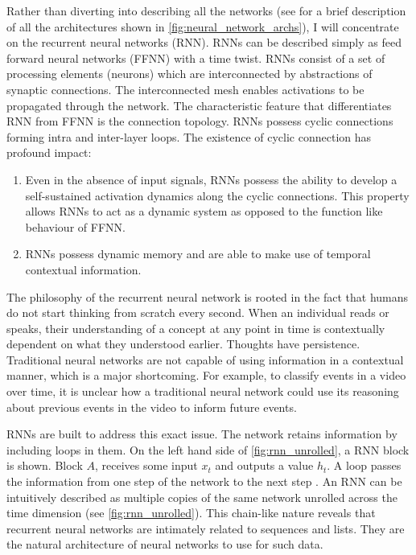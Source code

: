 Rather than diverting into describing all the networks (see \citep{neuralnetworkzoo} for a brief description of all the architectures shown in \figurename \ref{fig:neural_network_archs}), I will concentrate on the recurrent neural networks (RNN). RNNs can be described simply as feed forward neural networks (FFNN) with a time twist. RNNs consist of a set of processing elements (neurons) which are interconnected by abstractions of synaptic connections. The interconnected mesh enables activations to be propagated through the network. The characteristic feature that differentiates RNN from FFNN is the connection topology. RNNs possess cyclic connections forming intra and inter-layer loops. The existence of cyclic connection has profound impact: 
\begin{enumerate}
	\item Even in the absence of input signals, RNNs possess the ability to develop a self-sustained activation dynamics along the cyclic connections. This property allows RNNs to act as a dynamic system as opposed to the function like behaviour of FFNN.
	\item RNNs possess dynamic memory and are able to make use of temporal contextual information. 
\end{enumerate}

The philosophy of the recurrent neural network is rooted in the fact that humans do not start thinking from scratch every second. When an individual reads or speaks, their understanding of a concept at any point in time is contextually dependent on what they understood earlier. Thoughts have persistence. Traditional neural networks are not capable of using information in a contextual manner, which is a major shortcoming. For example, to classify events in a video over time, it is unclear how a traditional neural network could use its reasoning about previous events in the video to inform future events.

RNNs are built to address this exact issue. The network retains information by including loops in them. On the left hand side of \figurename \ref{fig:rnn_unrolled}, a RNN block is shown. Block $A$, receives some input $x_t$ and outputs a value $h_t$. A loop passes the information from one step of the network to the next step \citep{rnnexplanation}. An RNN can be intuitively described as multiple copies of the same network unrolled across the time dimension (see \figurename \ref{fig:rnn_unrolled}). This chain-like nature reveals that recurrent neural networks are intimately related to sequences and lists. They are the natural architecture of neural networks to use for such data.

